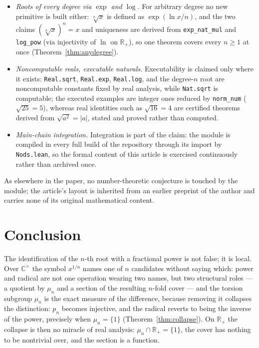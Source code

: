 \documentclass[submission,noinfoline]{jsfds}
\newcommand{\abs}[1]{\lvert #1\rvert}
\begin{document}
\begin{itemize}
\item \emph{Roots of every degree via $\exp$ and $\log$.} For arbitrary
degree no new primitive is built either: $\sqrt[n]{x}$ is defined as
$\exp(\ln x/n)$, and the two claims $(\sqrt[n]{x})^n=x$ and uniqueness
are derived from \texttt{exp\_nat\_mul} and \texttt{log\_pow} (via
injectivity of $\ln$ on $\mathbb R_+$), so one theorem covers every
$n\ge1$ at once (Theorem~\ref{thm:anydegree}).
\item \emph{Noncomputable reals, executable naturals.} Executability is
claimed only where it exists: \texttt{Real.sqrt}, \texttt{Real.exp},
\texttt{Real.log}, and the degree-$n$ root are noncomputable constants
fixed by real analysis, while \texttt{Nat.sqrt} is computable; the
executed examples are integer ones reduced by \texttt{norm\_num}
($\sqrt{25}=5$), whereas real identities such as $\sqrt{16}=4$ are
certified theorems derived from $\sqrt{a^2}=\abs a$, stated and proved
rather than computed.
\item \emph{Main-chain integration.} Integration is part of the claim:
the module is compiled in every full build of the repository through its
import by \texttt{Nods.lean}, so the formal content of this article is
exercised continuously rather than archived once.
\end{itemize}
As elsewhere in the paper, no number-theoretic conjecture is touched by
the module; the article's layout is inherited from an earlier preprint of
the author and carries none of its original mathematical content.

\section{Conclusion}\label{sec:conclusion}

The identification of the $n$-th root with a fractional power is not
false; it is local. Over $\mathbb C^\times$ the symbol $x^{1/n}$ names
one of $n$ candidates without saying which: power and radical are not
one operation wearing two names, but two structural roles --- a quotient
by $\mu_n$ and a section of the resulting $n$-fold cover --- and the
torsion subgroup $\mu_n$ is the exact measure of the difference, because
removing it collapses the distinction: $p_n$ becomes injective, and the
radical reverts to being the inverse of the power, precisely when
$\mu_n=\{1\}$ (Theorem~\ref{thm:collapse}). On $\mathbb R_+$ the
collapse is then no miracle of real analysis: $\mu_n\cap\mathbb R_+=\{1\}$,
the cover has nothing to be nontrivial over, and the section is a
function.
\end{document}
